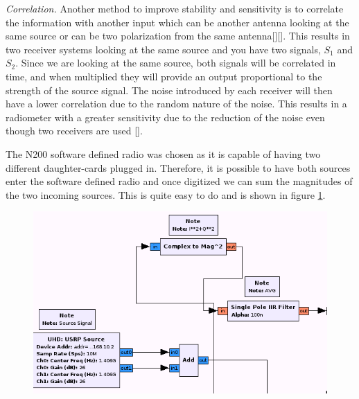 
 
\emph{Correlation.}  Another method to improve stability and sensitivity is to correlate the information with another input which can be another antenna looking at the same source or can be two polarization from the same antenna[\cite{Clapp}][\cite{Aitken}].  This results in two receiver systems looking at the same source and you have two signals, $S_1$ and $S_2$.  Since we are looking at the same source, both signals will be correlated in time, and when multiplied they will provide an output proportional to the strength of the source signal.  The noise introduced by each receiver will then have a lower correlation due to the random nature of the noise.  This results in a radiometer with a greater sensitivity due to the reduction of the noise even though two receivers are used [\cite{Fujimoto}].

The N200 software defined radio was chosen as it is capable of having two different daughter-cards plugged in.  Therefore, it is possible to have both sources enter the software defined radio and once digitized we can sum the magnitudes of the two incoming sources.  This is quite easy to do and is shown in figure \ref{correlating_sdr}.

{\begin{figure}[h!tb] 
\centering
\includegraphics[width=14cm]{Images/N200_rad_corr.png}
\label{correlating_sdr}
\end{figure}
}

